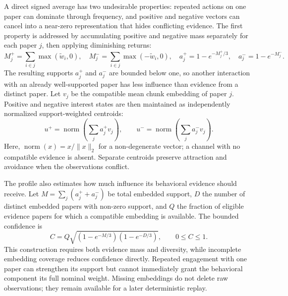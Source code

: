 A direct signed average has two undesirable properties: repeated actions on one paper can dominate through frequency, and positive and negative vectors can cancel into a near-zero representation that hides conflicting evidence. The first property is addressed by accumulating positive and negative mass separately for each paper \(j\), then applying diminishing returns:
\begin{equation}
  M_j^+=\sum_{i\in j}\max(\widetilde{w}_i,0),
  \quad M_j^-=\sum_{i\in j}\max(-\widetilde{w}_i,0),
  \quad a_j^+=1-e^{-M_j^+/3},
  \quad a_j^-=1-e^{-M_j^-}.
  \label{eq:behavior-saturation}
\end{equation}
The resulting supports \(a_j^+\) and \(a_j^-\) are bounded below one, so another interaction with an already well-supported paper has less influence than evidence from a distinct paper. Let \(v_j\) be the compatible mean chunk embedding of paper \(j\). Positive and negative interest states are then maintained as independently normalized support-weighted centroids:
\begin{equation}
  u^+=\operatorname{norm}\!\left(\sum_j a_j^+v_j\right),
  \qquad
  u^-=\operatorname{norm}\!\left(\sum_j a_j^-v_j\right).
  \label{eq:behavior-contrastive-profile}
\end{equation}
Here, \(\operatorname{norm}(x)=x/\lVert x\rVert_2\) for a non-degenerate vector; a channel with no compatible evidence is absent. Separate centroids preserve attraction and avoidance when the observations conflict.

The profile also estimates how much influence its behavioral evidence should receive. Let \(M=\sum_j(a_j^++a_j^-)\) be total embedded support, \(D\) the number of distinct embedded papers with non-zero support, and \(Q\) the fraction of eligible evidence papers for which a compatible embedding is available. The bounded confidence is
\begin{equation}
  C=Q\sqrt{\left(1-e^{-M/3}\right)\left(1-e^{-D/3}\right)},
  \qquad 0\leq C\leq 1.
  \label{eq:behavior-confidence}
\end{equation}
This construction requires both evidence mass and diversity, while incomplete embedding coverage reduces confidence directly. Repeated engagement with one paper can strengthen its support but cannot immediately grant the behavioral component its full nominal weight. Missing embeddings do not delete raw observations; they remain available for a later deterministic replay.

